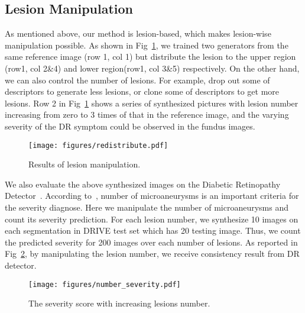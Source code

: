 \documentclass[letterpaper]{article} %
\begin{document}
    \subsection{Lesion Manipulation}
        	
	As mentioned above, our method is lesion-based, which makes lesion-wise manipulation possible. As shown in Fig~\ref{fig:redistribute}, we trained two generators from the same reference image (row 1, col 1) but distribute the lesion to the upper region (row1, col 2\&4) and lower region(row1, col 3\&5) respectively. On the other hand, we can also control the number of lesions. For example, drop out some of descriptors to generate less lesions, or clone some of descriptors to get more lesions. Row 2 in Fig~\ref{fig:redistribute} shows a series of synthesized pictures with lesion number increasing from zero to 3 times of that in the reference image, and the varying severity of the DR symptom could be observed in the fundus images.

	

	\begin{figure}[h!]
		\begin{center}
			\texttt{[image: figures/redistribute.pdf]}
		\end{center}
		\caption{Results of lesion manipulation.}
		\label{fig:redistribute}
        \end{figure}
    
        
  We also evaluate the above synthesized images on the Diabetic Retinopathy Detector~\cite{oO2016detector}.  According to~\cite{aao2002drscale}, number of microaneurysms is an important criteria for the severity diagnose.  Here we manipulate the number of microaneurysms and count its severity prediction. For each lesion number, we synthesize 10 images on each segmentation in DRIVE test set which has 20 testing image. Thus, we count the predicted severity for 200 images over each number of lesions. As reported in Fig~\ref{fig:number_severity}, by manipulating the lesion number, we receive consistency result from DR detector.
  
  	\begin{figure}[t]
		\begin{center}
			\texttt{[image: figures/number\_severity.pdf]}
		\end{center}
		\caption{The severity score with increasing lesions number.}
		\label{fig:number_severity}
	\end{figure}
  
\end{document}
